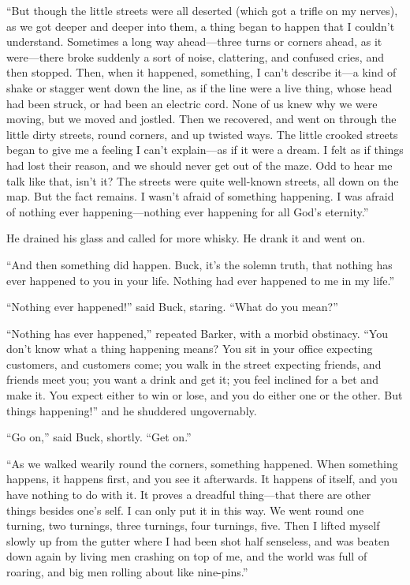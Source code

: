 \documentclass{book}
\begin{document}
“But though the little streets were all deserted (which got a trifle on my nerves), as we got deeper and deeper into them, a thing began to happen that I couldn’t understand. Sometimes a long way ahead—three turns or corners ahead, as it were—there broke suddenly a sort of noise, clattering, and confused cries, and then stopped. Then, when it happened, something, I can’t describe it—a kind of shake or stagger went down the line, as if the line were a live thing, whose head had been struck, or had been an electric cord. None of us knew why we were moving, but we moved and jostled. Then we recovered, and went on through the little dirty streets, round corners, and up twisted ways. The little crooked streets began to give me a feeling I can’t explain—as if it were a dream. I felt as if things had lost their reason, and we should never get out of the maze. Odd to hear me talk like that, isn’t it? The streets were quite well-known streets, all down on the map. But the fact remains. I wasn’t afraid of something happening. I was afraid of nothing ever happening—nothing ever happening for all God’s eternity.”

He drained his glass and called for more whisky. He drank it and went on.

“And then something did happen. Buck, it’s the solemn truth, that nothing has ever happened to you in your life. Nothing had ever happened to me in my life.”

“Nothing ever happened!” said Buck, staring. “What do you mean?”

“Nothing has ever happened,” repeated Barker, with a morbid obstinacy. “You don’t know what a thing happening means? You sit in your office expecting customers, and customers come; you walk in the street expecting friends, and friends meet you; you want a drink and get it; you feel inclined for a bet and make it. You expect either to win or lose, and you do either one or the other. But things happening!” and he shuddered ungovernably.

“Go on,” said Buck, shortly. “Get on.”

“As we walked wearily round the corners, something happened. When something happens, it happens first, and you see it afterwards. It happens of itself, and you have nothing to do with it. It proves a dreadful thing—that there are other things besides one’s self. I can only put it in this way. We went round one turning, two turnings, three turnings, four turnings, five. Then I lifted myself slowly up from the gutter where I had been shot half senseless, and was beaten down again by living men crashing on top of me, and the world was full of roaring, and big men rolling about like nine-pins.”
\end{document}
